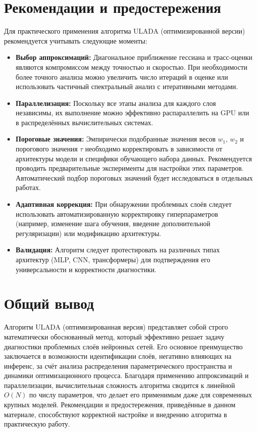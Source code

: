 \documentclass[a4paper,12pt]{article}
\begin{document}
\newpage

\section{Рекомендации и предостережения}

Для практического применения алгоритма ULADA (оптимизированной версии) рекомендуется учитывать следующие моменты:
\begin{itemize}
    \item \textbf{Выбор аппроксимаций:} Диагональное приближение гессиана и трасс-оценки являются компромиссом между точностью и скоростью. При необходимости более точного анализа можно увеличить число итераций в оценке или использовать частичный спектральный анализ с итеративными методами.
    \item \textbf{Параллелизация:} Поскольку все этапы анализа для каждого слоя независимы, их выполнение можно эффективно распараллелить на GPU или в распределённых вычислительных системах.
    \item \textbf{Пороговые значения:} Эмпирически подобранные значения весов \( w_1 \), \( w_2 \) и порогового значения \(\tau\) необходимо корректировать в зависимости от архитектуры модели и специфики обучающего набора данных. Рекомендуется проводить предварительные эксперименты для настройки этих параметров. Автоматический подбор пороговых значений будет исследоваться в отдельных работах.
    \item \textbf{Адаптивная коррекция:} При обнаружении проблемных слоёв следует использовать автоматизированную корректировку гиперпараметров (например, изменение шага обучения, введение дополнительной регуляризации) или модификацию архитектуры.
    \item \textbf{Валидация:} Алгоритм следует протестировать на различных типах архитектур (MLP, CNN, трансформеры) для подтверждения его универсальности и корректности диагностики.
\end{itemize}

\section*{Общий вывод}

Алгоритм ULADA (оптимизированная версия) представляет собой строго математически обоснованный метод, который эффективно решает задачу диагностики проблемных слоёв нейронных сетей. Его основное преимущество заключается в возможности идентификации слоёв, негативно влияющих на инференс, за счёт анализа распределения параметрического пространства и динамики оптимизационного процесса. Благодаря применению аппроксимаций и параллелизации, вычислительная сложность алгоритма сводится к линейной \( O(N) \) по числу параметров, что делает его применимым даже для современных крупных моделей. Рекомендации и предостережения, приведённые в данном материале, способствуют корректной настройке и внедрению алгоритма в практическую работу.
\end{document}
